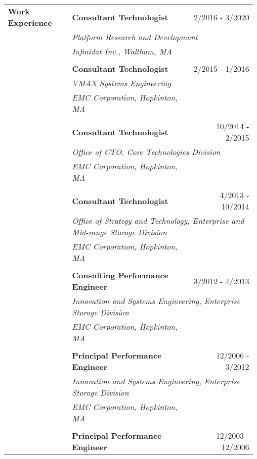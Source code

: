 \begin{longtable}{p{ 90pt}p{299pt}r}
{\bf Work Experience} & {\bf Consultant Technologist} & {2/2016 - 3/2020}\\
                      & \multicolumn{2}{p{4.5in}}{\em Platform Research and Development} \\
                      & {\em Infinidat Inc., Waltham, MA} \\
\\
                      & {\bf Consultant Technologist} & {2/2015 - 1/2016}\\
                      & \multicolumn{2}{p{4.5in}}{\em VMAX Systems Engineering} \\
                      & {\em EMC Corporation, Hopkinton, MA} \\
\\
                      & {\bf Consultant Technologist} & {10/2014 - 2/2015}\\
                      & \multicolumn{2}{p{4.5in}}{\em Office of CTO, Core Technologies Division} \\
                      & {\em EMC Corporation, Hopkinton, MA} \\
\\
                      & {\bf Consultant Technologist} & {4/2013 - 10/2014}\\
                      & \multicolumn{2}{p{4.5in}}{\em Office of Strategy and Technology, Enterprise and Mid-range Storage Division} \\
                      & {\em EMC Corporation, Hopkinton, MA} \\
\\
                      & {\bf Consulting Performance Engineer} & {3/2012 - 4/2013}\\
                      & \multicolumn{2}{p{4.5in}}{\em Innovation and Systems Engineering, Enterprise Storage Division} \\
                      & {\em EMC Corporation, Hopkinton, MA} \\
\\
                      & {\bf Principal Performance Engineer} & {12/2006 - 3/2012}\\
                      & \multicolumn{2}{p{4.5in}}{\em Innovation and Systems Engineering, Enterprise Storage Division} \\
                      & {\em EMC Corporation, Hopkinton, MA} \\
\\
                      & {\bf Principal Performance Engineer} & {12/2003 - 12/2006}\\

\end{longtable}
